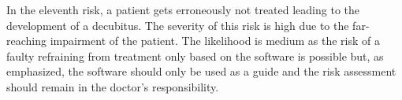 In the eleventh risk, a patient gets erroneously not treated leading to the development of a decubitus.
The severity of this risk is high due to the far-reaching impairment of the patient.
The likelihood is medium as the risk of a faulty refraining from treatment only based on the software is possible but, as emphasized, the software should only be used as a guide and the risk assessment should remain in the doctor's responsibility.